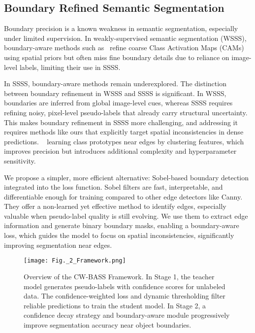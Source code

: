 \subsection{Boundary Refined Semantic Segmentation}
Boundary precision is a known weakness in semantic segmentation, especially under limited supervision. In weakly-supervised semantic segmentation (WSSS), boundary-aware methods such as~\cite{zheng2024intramixintraclassmixupgeneration} \cite{chen2022class} refine coarse Class Activation Maps (CAMs) using spatial priors but often miss fine boundary details due to reliance on image-level labels, limiting their use in SSSS.

In SSSS, boundary-aware methods remain underexplored. The distinction between boundary refinement in WSSS and SSSS is significant. In WSSS, boundaries are inferred from global image-level cues, whereas SSSS requires refining noisy, pixel-level pseudo-labels that already carry structural uncertainty. This makes boundary refinement in SSSS more challenging, and addressing it requires methods like ours that explicitly target spatial inconsistencies in dense predictions. ~\cite{dong2024boundary} learning class prototypes near edges by clustering features, which improves precision but introduces additional complexity and hyperparameter sensitivity.

We propose a simpler, more efficient alternative: Sobel-based boundary detection integrated into the loss function. Sobel filters \cite{jensen2020multiobject} are fast, interpretable, and differentiable enough for training compared to other edge detectors like Canny. They offer a non-learned yet effective method to identify edges, especially valuable when pseudo-label quality is still evolving. We use them to extract edge information and generate binary boundary masks, enabling a boundary-aware loss, which guides the model to focus on spatial inconsistencies, significantly improving segmentation near edges.


\begin{figure*}[ht]
\centering
\texttt{[image: Fig.\_2\_Framework.png]}
\caption{Overview of the CW-BASS Framework. In Stage 1, the teacher model generates pseudo-labels with confidence scores for unlabeled data. The confidence-weighted loss and dynamic thresholding filter reliable predictions to train the student model. In Stage 2, a confidence decay strategy and boundary-aware module progressively improve segmentation accuracy near object boundaries.}
\label{Fig._2_Framework.png}
\end{figure*}